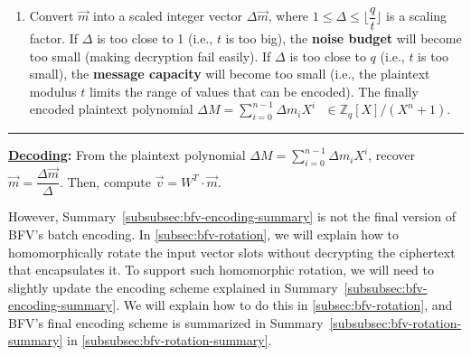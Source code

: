 \begin{tcolorbox}[title={\textbf{\tboxlabel{\ref*{subsubsec:bfv-encoding-summary}} BFV's Encoding and Decoding}}]
\begin{enumerate}
$ $

, where $\omega$ is a primitive $2n$-th root of unity modulo $t$. This implies that $\omega = g^{\frac{t - 1}{2n}} \bmod t$ ($g$ is a generator of $\mathbb{Z}_t^{\times}$ (see \autoref{subsubsec:poly-vector-transformation-modulus}).

$ $

\item Convert $\vec{m}$ into a scaled integer vector $\Delta\vec{m}$, where $1 \leq \Delta \leq \lfloor \dfrac{q}{t}\rfloor$ is a scaling factor. If $\Delta$ is too close to 1 (i.e., $t$ is too big), the \textbf{noise budget} will become too small (making decryption fail easily). If $\Delta$ is too close to $q$ (i.e., $t$ is too small), the \textbf{message capacity} will become too small (i.e., the plaintext modulus $t$ limits the range of values that can be encoded). The finally encoded plaintext polynomial $\Delta M = \sum\limits_{i=0}^{n-1} \Delta m_i X^i \text{ } \in \mathbb{Z}_q[X] / (X^n + 1)$. %

\end{enumerate}

\par\noindent\rule{\textwidth}{0.4pt}

\textbf{\underline{Decoding}:} From the plaintext polynomial $\Delta M = \sum\limits_{i=0}^{n-1}\Delta m_iX^i$, recover $\vec{m} = \dfrac{\Delta \vec{m}}{\Delta}$. Then,
compute $\vec{v} = W^T \cdot \vec{m}$.

\end{tcolorbox}



However, Summary~\ref*{subsubsec:bfv-encoding-summary} is not the final version of BFV's batch encoding. In \autoref{subsec:bfv-rotation}, we will explain how to homomorphically rotate the input vector slots without decrypting the ciphertext that encapsulates it. To support such homomorphic rotation, we will need to slightly update the encoding scheme explained in Summary~\ref*{subsubsec:bfv-encoding-summary}. We will explain how to do this in \autoref{subsec:bfv-rotation}, and BFV's final encoding scheme is summarized in Summary~\ref*{subsubsec:bfv-rotation-summary} in \autoref{subsubsec:bfv-rotation-summary}.


